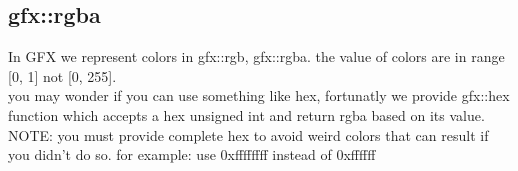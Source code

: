 \subsection{gfx::rgba}
    In GFX we represent colors in gfx::rgb, gfx::rgba.
  the value of colors are in range [0, 1] not [0, 255]. \\
  you may wonder if you can use something like hex,
  fortunatly we provide gfx::hex function which accepts
  a hex unsigned int and return rgba based on its value. \\
  NOTE: you must provide complete hex to avoid weird colors
  that can result if you didn't do so.
  for example:
    use 0xffffffff instead of 0xffffff
